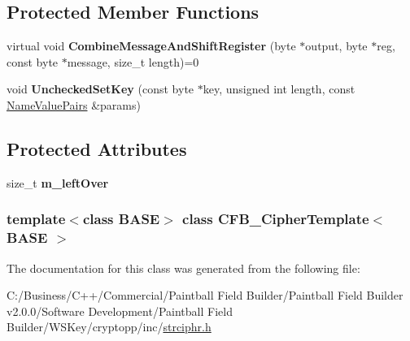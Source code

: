 \subsection*{Protected Member Functions}
\begin{DoxyCompactItemize}
\item 
\hypertarget{class_c_f_b___cipher_template_a09a7d08859049cefee1dc46b5a405805}{
virtual void {\bfseries CombineMessageAndShiftRegister} (byte $\ast$output, byte $\ast$reg, const byte $\ast$message, size\_\-t length)=0}
\label{class_c_f_b___cipher_template_a09a7d08859049cefee1dc46b5a405805}

\item 
\hypertarget{class_c_f_b___cipher_template_aecb03ad65083bbba86bdffcaf5d79da6}{
void {\bfseries UncheckedSetKey} (const byte $\ast$key, unsigned int length, const \hyperlink{class_name_value_pairs}{NameValuePairs} \&params)}
\label{class_c_f_b___cipher_template_aecb03ad65083bbba86bdffcaf5d79da6}

\end{DoxyCompactItemize}
\subsection*{Protected Attributes}
\begin{DoxyCompactItemize}
\item 
\hypertarget{class_c_f_b___cipher_template_a1360b5b5f16118705792176b1847027a}{
size\_\-t {\bfseries m\_\-leftOver}}
\label{class_c_f_b___cipher_template_a1360b5b5f16118705792176b1847027a}

\end{DoxyCompactItemize}
\subsubsection*{template$<$class BASE$>$ class CFB\_\-CipherTemplate$<$ BASE $>$}



The documentation for this class was generated from the following file:\begin{DoxyCompactItemize}
\item 
C:/Business/C++/Commercial/Paintball Field Builder/Paintball Field Builder v2.0.0/Software Development/Paintball Field Builder/WSKey/cryptopp/inc/\hyperlink{strciphr_8h}{strciphr.h}\end{DoxyCompactItemize}
